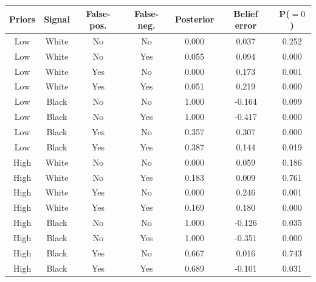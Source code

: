 \begin{table}[H]\centering \scriptsize \begin{tabular}{ccccccc} \hline \hline
\textbf{Priors}&\textbf{Signal}&\textbf{False-pos.}&\textbf{False-neg.}&\textbf{Posterior}&\textbf{Belief error}& \textbf{P($=0$)}\\ \hline
Low&White&No&No&0.000&0.037&0.252\\
Low&White&No&Yes&0.055&0.094&0.000\\
Low&White&Yes&No&0.000&0.173&0.001\\
Low&White&Yes&Yes&0.051&0.219&0.000\\
Low&Black&No&No&1.000&-0.164&0.099\\
Low&Black&No&Yes&1.000&-0.417&0.000\\
Low&Black&Yes&No&0.357&0.307&0.000\\
Low&Black&Yes&Yes&0.387&0.144&0.019\\
High&White&No&No&0.000&0.059&0.186\\
High&White&No&Yes&0.183&0.009&0.761\\
High&White&Yes&No&0.000&0.246&0.001\\
High&White&Yes&Yes&0.169&0.180&0.000\\
High&Black&No&No&1.000&-0.126&0.035\\
High&Black&No&Yes&1.000&-0.351&0.000\\
High&Black&Yes&No&0.667&0.016&0.743\\
High&Black&Yes&Yes&0.689&-0.101&0.031\\
\hline \end{tabular} \end{table}
